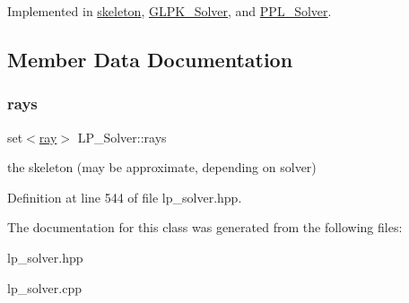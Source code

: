 Implemented in \hyperlink{classskeleton_ac366952c2b0908159255916a1e37f9b3}{skeleton}, \hyperlink{class_g_l_p_k___solver_a6d800f0ec270c782e3cf855aa7f59f4c}{G\+L\+P\+K\+\_\+\+Solver}, and \hyperlink{class_p_p_l___solver_a5000b8c5bee37029276ce63a3568bfb7}{P\+P\+L\+\_\+\+Solver}.



\subsection{Member Data Documentation}
\mbox{\label{class_l_p___solver_aa89c9167eb3ef921b57d74057217f407}} 
\subsubsection{\texorpdfstring{rays}{rays}}
{\footnotesize\ttfamily set$<$\hyperlink{classray}{ray}$>$ L\+P\+\_\+\+Solver\+::rays\hspace{0.3cm}{\ttfamily [protected]}}

the skeleton (may be approximate, depending on solver) 

Definition at line 544 of file lp\+\_\+solver.\+hpp.



The documentation for this class was generated from the following files\+:\begin{DoxyCompactItemize}
\item 
lp\+\_\+solver.\+hpp\item 
lp\+\_\+solver.\+cpp\end{DoxyCompactItemize}
